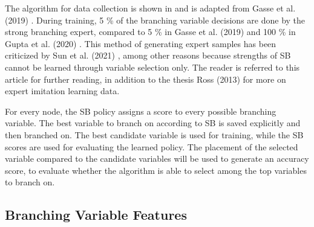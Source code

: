 The algorithm for data collection is shown in  and is adapted from Gasse et al. (2019) \cite{gasse2019exact}. During training, 5 \% of the branching variable decisions are done by the strong branching expert, compared to 5 \% in Gasse et al. (2019) \cite{gasse2019exact} and 100 \% in Gupta et al. (2020) \cite{gupta2020hybrid}. This method of generating expert samples has been criticized by Sun et al. (2021) \cite{sun2021improving}, among other reasons because strengths of \gls{SB} cannot be learned through variable selection only. The reader is referred to this article for further reading, in addition to the thesis Ross (2013) \cite{ross2013interactive} for more on expert imitation learning data. 



For every node, the \gls{SB} policy assigns a score to every possible branching variable. The best variable to branch on according to \gls{SB} is saved explicitly and then branched on. The best candidate variable is used for training, while the \gls{SB} scores are used for evaluating the learned policy. The placement of the selected variable compared to the candidate variables will be used to generate an accuracy score, to evaluate whether the algorithm is able to select among the top variables to branch on.  


\subsection{Branching Variable Features}

